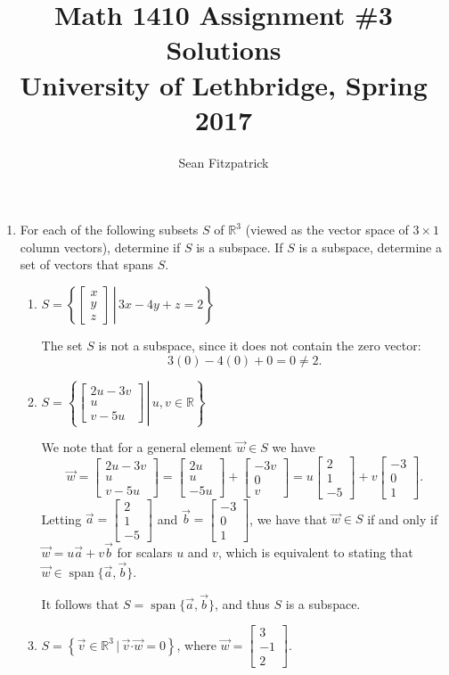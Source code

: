 \documentclass[letterpaper,12pt]{article}
\title{Math 1410 Assignment \#3 Solutions\\University of Lethbridge, Spring 2017}
\author{Sean Fitzpatrick}
\newcommand{\R}{\mathbb{R}}
\newcommand{\dotp}{\boldsymbol{\cdot}}
\newcommand{\bbm}{\begin{bmatrix}}
\newcommand{\ebm}{\end{bmatrix}}
\begin{document}
 \maketitle


\begin{enumerate}
\item For each of the following subsets $S$ of $\R^3$ (viewed as the vector space of $3\times 1$ column vectors), determine if $S$ is a subspace. If $S$ is a subspace, determine a set of vectors that spans $S$.
\begin{enumerate}
 \item $S = \left\{\left. \bbm x\\y\\z\ebm \,\right|\, 3x-4y+z=2\right\}$

\bigskip

The set $S$ is not a subspace, since it does not contain the zero vector: 
\[
 3(0)-4(0)+0=0\neq 2.
\]


\medskip

 \item $S = \left\{\left. \bbm 2u-3v\\u\\v-5u\ebm \,\right|\, u,v\in \R\right\}$

\bigskip

We note that for a general element $\vec{w}\in S$ we have
\[
 \vec{w} = \bbm 2u-3v\\u\\v-5u\ebm = \bbm 2u\\u\\-5u\ebm+\bbm -3v\\0\\v\ebm = u\bbm 2\\1\\-5\ebm+v\bbm -3\\0\\1\ebm.
\]
Letting $\vec{a} = \bbm 2\\1\\-5\ebm$ and $\vec{b}=\bbm -3\\0\\1\ebm$, we have that $\vec{w}\in S$ if and only if $\vec{w}=u\vec{a}+v\vec{b}$ for scalars $u$ and $v$, which is equivalent to stating that $\vec{w}\in\operatorname{span}\{\vec{a},\vec{b}\}$.

It follows that $S=\operatorname{span}\{\vec{a},\vec{b}\}$, and thus $S$ is a subspace.

\pagebreak

 \item $S = \left\{\vec{v}\in\R^3 \,|\, \vec{v}\dotp \vec{w} =0\right\}$, where $\vec{w} = \bbm 3\\-1\\2\ebm$.


\end{enumerate}
\end{enumerate}
\end{document}
